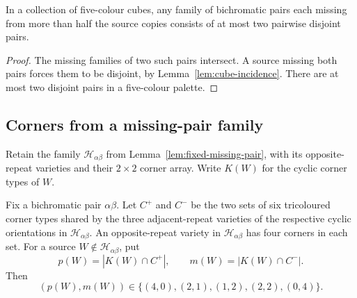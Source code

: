 \begin{lemma}\label{lem:rare-pairs}
In a collection of five-colour cubes, any family of bichromatic pairs each
missing from more than half the source copies consists of at most two
pairwise disjoint pairs.
\end{lemma}
\begin{proof}
The missing families of two such pairs intersect. A source missing both
pairs forces them to be disjoint, by Lemma~\ref{lem:cube-incidence}.
There are at most two disjoint pairs in a five-colour palette.
\end{proof}

\subsection{Corners from a missing-pair family}
Retain the family $\mathcal H_{\alpha\beta}$ from Lemma~\ref{lem:fixed-missing-pair},
with its opposite-repeat varieties and their $2\times2$ corner array.
Write $K(W)$ for the cyclic corner types of $W$.

\begin{lemma}\label{lem:thin-projections}
Fix a bichromatic pair $\alpha\beta$.  Let $C^+$ and $C^-$ be the two sets of six
tricoloured corner types shared by the three adjacent-repeat varieties of
the respective cyclic orientations in $\mathcal H_{\alpha\beta}$.  An
opposite-repeat variety in $\mathcal H_{\alpha\beta}$ has four corners in each set.
For a source $W\notin\mathcal H_{\alpha\beta}$, put
\[
 p(W)=|K(W)\cap C^+|,\qquad m(W)=|K(W)\cap C^-|.
\]
Then
\[
 (p(W),m(W))\in\{(4,0),(2,1),(1,2),(2,2),(0,4)\}.
\]
\end{lemma}


